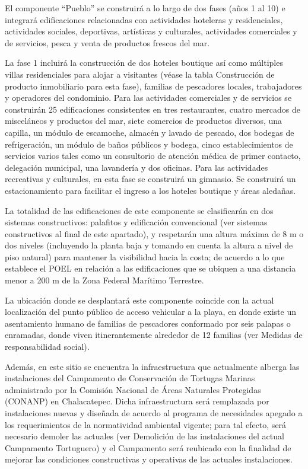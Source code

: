 \documentclass[twoside]{article}
\begin{document}
\begin{multicols}{2}
\bigskip

\footnotesize El componente “Pueblo” se construirá a lo largo de dos fases (años 1 al 10) e integrará edificaciones relacionadas con actividades hoteleras y residenciales, actividades sociales, deportivas, artísticas y culturales, actividades comerciales y de servicios, pesca y venta de productos frescos del mar.

La fase 1 incluirá la construcción de dos hoteles boutique así como múltiples villas residenciales para alojar a visitantes (véase la tabla Construcción de producto inmobiliario para esta fase), familias de pescadores locales, trabajadores y operadores del condominio. Para las actividades comerciales y de servicios se construirán 25 edificaciones consistentes en tres restaurantes, cuatro mercados de misceláneos y productos del mar, siete comercios de productos diversos, una capilla, un módulo de escamoche, almacén y lavado de pescado, dos bodegas de refrigeración, un módulo de baños públicos y bodega, cinco establecimientos de servicios varios tales como un consultorio de atención médica de primer contacto, delegación municipal, una lavandería y dos oficinas. Para las actividades recreativas y culturales, en esta fase se construirá un gimnasio. Se construirá un estacionamiento para facilitar el ingreso a los hoteles boutique y áreas aledañas.

La totalidad de las edificaciones de este componente se clasificarán en dos sistemas constructivos: palafitos y edificación convencional (ver sistemas constructivos al final de este apartado), y respetarán una altura máxima de 8 m o dos niveles (incluyendo la planta baja y tomando en cuenta la altura a nivel de piso natural) para mantener la visibilidad hacia la costa; de acuerdo a lo que establece el POEL en relación a las edificaciones que se ubiquen a una distancia menor a 200 m de la Zona Federal Marítimo Terrestre.

La ubicación donde se desplantará este componente coincide con la actual localización del punto público de acceso vehicular a la playa, en donde existe un asentamiento humano de familias de pescadores conformado por seis palapas o enramadas, donde viven itinerantemente alrededor de 12 familias (ver Medidas de responsabilidad social).

Además, en este sitio se encuentra la infraestructura que actualmente alberga las instalaciones del Campamento de Conservación de Tortugas Marinas administrado por la Comisión Nacional de Áreas Naturales Protegidas (CONANP) en Chalacatepec. Dicha infraestructura será remplazada por instalaciones nuevas y diseñada de acuerdo al programa de necesidades apegado a los requerimientos de la normatividad ambiental vigente; para tal efecto, será necesario demoler las actuales (ver Demolición de las instalaciones del actual Campamento Tortuguero) y el Campamento será reubicado con la finalidad de mejorar las condiciones constructivas y operativas de las actuales instalaciones.


\end{multicols}
\end{document}
